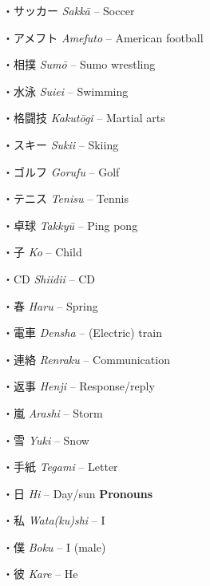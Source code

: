 \par{・サッカー \emph{Sakkā }– Soccer }
 
\par{・アメフト \emph{Amefuto }– American football }
 
\par{・相撲 \emph{Sumō }– Sumo wrestling }
 
\par{・水泳 \emph{Suiei }– Swimming }
 
\par{・格闘技 \emph{Kakutōgi }– Martial arts }
 
\par{・スキー \emph{Sukii }– Skiing }
 
\par{・ゴルフ \emph{Gorufu }– Golf }
 
\par{・テニス \emph{Tenisu }– Tennis }
 
\par{・卓球 \emph{Takkyū }– Ping pong }
 
\par{・子 \emph{Ko }– Child }
 
\par{・CD \emph{Shiidii }– CD }
 
\par{・春 \emph{Haru }– Spring }
 
\par{・電車 \emph{Densha }– (Electric) train }
 
\par{・連絡 \emph{Renraku }– Communication }
 
\par{・返事 \emph{Henji }– Response\slash reply }
 
\par{・嵐 \emph{Arashi }– Storm }
 
\par{・雪 \emph{Yuki }– Snow }
 
\par{・手紙 \emph{Tegami }– Letter }
 
\par{・日 \emph{Hi }– Day\slash sun }
  \textbf{Pronouns }
\par{・私 \emph{Wata(ku)shi }– I }

\par{・僕 \emph{Boku }– I (male) }

\par{・彼 \emph{Kare }– He }

